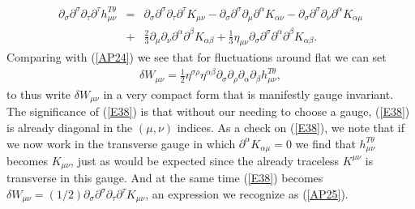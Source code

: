 \documentclass[aps]{revtex4}
\begin{document}
%
\begin{eqnarray}
\partial_{\sigma}\partial^{\sigma}\partial_{\tau}\partial^{\tau}h_{\mu\nu}^{T\theta}&=&
\partial_{\sigma}\partial^{\sigma}\partial_{\tau}\partial^{\tau}K_{\mu\nu}
-\partial_{\sigma}\partial^{\sigma}\partial_{\mu}\partial^{\alpha}K_{\alpha\nu}
-\partial_{\sigma}\partial^{\sigma}\partial_{\nu}\partial^{\alpha}K_{\alpha\mu}
\nonumber\\
&+&\frac{2}{3}\partial_{\mu}\partial_{\nu}\partial^{\alpha}\partial^{\beta}K_{\alpha\beta}+\frac{1}{3}\eta_{\mu\nu}\partial_{\sigma}\partial^{\sigma}\partial^{\alpha}\partial^{\beta}K_{\alpha\beta}.
\label{E37}
\end{eqnarray}
%
Comparing with (\ref{AP24}) we see that for fluctuations around flat we can set 
%
\begin{eqnarray}
\delta W_{\mu\nu}=\frac{1}{2}\eta^{\sigma\rho}\eta^{\alpha\beta}\partial_{\sigma}\partial_{\rho} \partial_{\alpha}\partial_{\beta}h_{\mu\nu}^{T\theta},
\label{E38}
\end{eqnarray}
%
to thus write $\delta W_{\mu\nu}$ in a very compact form that is manifestly gauge invariant. The significance of (\ref{E38}) is that without our needing to choose a gauge, (\ref{E38}) is already diagonal in the $(\mu,\nu)$ indices. As a check on (\ref{E38}),  we note that if we now work in the transverse gauge in which $\partial^{\alpha}K_{\alpha\mu}=0$ we find that $h_{\mu\nu}^{T\theta}$ becomes $K_{\mu\nu}$, just as would be expected since the already traceless $K^{\mu\nu}$ is transverse in this gauge. And at the same time (\ref{E38}) becomes $\delta W_{\mu\nu}=(1/2)\partial_{\sigma}\partial^{\sigma}\partial_{\tau}\partial^{\tau}K_{\mu\nu}$, an expression we recognize as (\ref{AP25}).
\end{document}
